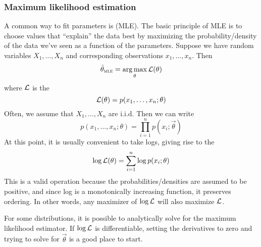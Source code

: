 \subsubsection{Maximum likelihood estimation}
A common way to fit parameters is  (MLE).
The basic principle of MLE is to choose values that ``explain'' the data best by maximizing the probability/density of the data we've seen as a function of the parameters.
Suppose we have random variables $X_1, \dots, X_n$ and corresponding observations $x_1, \dots, x_n$.
Then
\[\hat{\mathbf{\theta}}_\textsc{mle} = \operatorname*{arg\,max}_{\mathbf{\theta}} \mathcal{L}(\mathbf{\theta})\]
where $\mathcal{L}$ is the 
\[\mathcal{L}(\mathbf{\theta}) = p(x_1, \dots, x_n; \mathbf{\theta})\]
Often, we assume that $X_1, \dots, X_n$ are i.i.d. Then we can write
\[p(x_1, \dots, x_n; \theta) = \prod_{i=1}^n p(x_i; \vec{\theta})\]
At this point, it is usually convenient to take logs, giving rise to the 
\[\log\mathcal{L}(\mathbf{\theta}) = \sum_{i=1}^n \log p(x_i; \mathbf{\theta})\]
This is a valid operation because the probabilities/densities are assumed to be positive, and since log is a monotonically increasing function, it preserves ordering.
In other words, any maximizer of $\log\mathcal{L}$ will also maximize $\mathcal{L}$.

For some distributions, it is possible to analytically solve for the maximum likelihood estimator.
If $\log\mathcal{L}$ is differentiable, setting the derivatives to zero and trying to solve for $\vec{\theta}$ is a good place to start.

